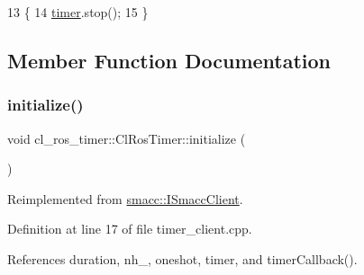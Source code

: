 \begin{DoxyCode}
13 \{
14     \hyperlink{classcl__ros__timer_1_1ClRosTimer_a50237ecbf49b178b9d109b25ba768f5a}{timer}.stop();
15 \}
\end{DoxyCode}


\subsection{Member Function Documentation}
\mbox{\label{classcl__ros__timer_1_1ClRosTimer_a874e97a9e3e974966ac4999e0a293e73}} 
\subsubsection{\texorpdfstring{initialize()}{initialize()}}
{\footnotesize\ttfamily void cl\+\_\+ros\+\_\+timer\+::\+Cl\+Ros\+Timer\+::initialize (\begin{DoxyParamCaption}{ }\end{DoxyParamCaption})\hspace{0.3cm}{\ttfamily [virtual]}}



Reimplemented from \hyperlink{classsmacc_1_1ISmaccClient_a974ebb6ad6cf812e7b9de6b78b3d901f}{smacc\+::\+I\+Smacc\+Client}.



Definition at line 17 of file timer\+\_\+client.\+cpp.



References duration, nh\+\_\+, oneshot, timer, and timer\+Callback().


